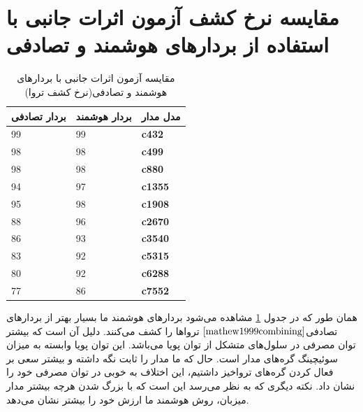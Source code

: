 \section{مقایسه نرخ کشف آزمون اثرات جانبی با استفاده از بردارهای هوشمند و تصادفی}
\begin{table}[t]

	\begin{center}
		\begin{tabular}{| p{4cm} | p{4cm} |p{2cm}|}
			\hline
			\textbf{ بردار تصادفی} & \textbf{ بردار هوشمند} & \textbf{مدل مدار} \\ \hline \hline
			99 & 99 &\textbf{c432} \\ \hline
			98 & 98 &\textbf{c499} \\ \hline
			98 & 98 &\textbf{c880} \\ \hline
			94 & 97 &\textbf{c1355} \\ \hline
			95 & 98 &\textbf{c1908} \\ \hline
			88 & 96 &\textbf{c2670} \\ \hline
			86 & 93 &\textbf{c3540} \\ \hline
			83 & 92 &\textbf{c5315} \\ \hline
			80 & 92 &\textbf{c6288} \\ \hline
			77 & 86 &\textbf{c7552} \\ \hline 
		\end{tabular}
		\caption{
		مقایسه آزمون اثرات جانبی با بردارهای هوشمند و تصادفی(نرخ کشف تروا)}
		\label{tsideivectors}
	\end{center}
\end{table}
همان طور که در جدول \ref{tsideivectors} مشاهده می‌شود بردارهای هوشمند ما بسیار بهتر از بردارهای تصادفی$\cite{mathew1999combining}$ تروا‌ها را کشف می‌کنند. دلیل آن است که بیشتر توان مصرفی در سلول‌های
متشکل از توان پویا می‌باشد. این توان پویا وابسته به میزان سوئیچینگ گره‌های مدار است. حال که ما مدار را ثابت نگه داشته و بیشتر سعی بر فعال کردن گره‌های تروا‌خیز داشتیم، این اختلاف به خوبی در توان مصرفی خود را نشان داد. نکته دیگری که به نظر می‌رسد این است که با بزرگ شدن هرچه بیشتر مدار میزبان، روش هوشمند ما ارزش خود را بیشتر نشان می‌دهد.





